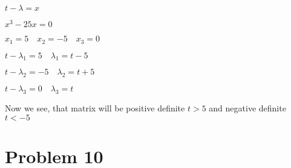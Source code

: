 \documentclass[12pt,letterpaper]{article}
\begin{document}
\begin{enumerate}[label=(\alph*)]
        $t - \lambda = x$
        
        $x^3 - 25x = 0$
        
        $x_1 = 5\quad x_2 = -5 \quad x_3 = 0$
        
        $t-\lambda_1 = 5\quad \lambda_1 = t-5$
        
        $t-\lambda_2 = -5\quad \lambda_2 = t+5$
        
        $t-\lambda_3 = 0\quad \lambda_3 = t$
        
       Now we see, that matrix will be positive definite $t > 5$ and negative definite $t < -5$
    \end{enumerate}

\section*{Problem 10}
\end{document}
